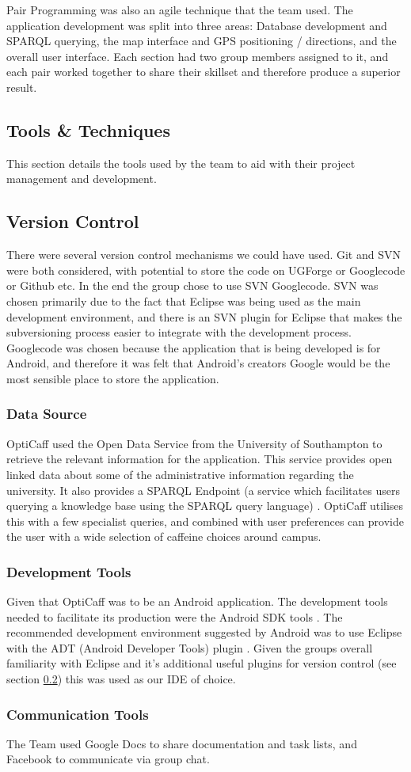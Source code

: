 Pair Programming was also an agile technique that the team used. The application development was split into three areas: Database development and SPARQL querying, the map interface and GPS positioning / directions, and the overall user interface. Each section had two group members assigned to it, and each pair worked together to share their skillset and therefore produce a superior result. 

\subsection{Tools \& Techniques}
This section details the tools used by the team to aid with their project management and development.

\subsection{Version Control}
\label{sec:VersionControl}
There were several version control mechanisms we could have used. Git and SVN were both considered, with potential to store the code on UGForge or Googlecode or Github etc. In the end the group chose to use SVN Googlecode. SVN was chosen primarily due to the fact that Eclipse was being used as the main development environment, and there is an SVN plugin for Eclipse that makes the subversioning process easier to integrate with the development process. Googlecode was chosen because the application that is being developed is for Android, and therefore it was felt that Android’s creators Google would be the most sensible place to store the application. 

\subsubsection{Data Source}
OptiCaff used the Open Data Service from the University of Southampton \cite{DataSouthampton} to retrieve the relevant information for the application. This service provides open linked data about some of the administrative information regarding the university. It also provides a SPARQL Endpoint \cite{SotonSparql} (a service which facilitates users querying a knowledge base using the SPARQL query language) \cite{SparqlEndpoint}. OptiCaff utilises this with a few specialist queries, and combined with user preferences can provide the user with a wide selection of caffeine choices around campus. 

\subsubsection{Development Tools}
Given that OptiCaff was to be an Android application. The development tools needed to facilitate its production were the Android SDK tools \cite{AndroidSDK}. The recommended development environment suggested by Android was to use Eclipse \cite{Eclipse} with the ADT (Android Developer Tools) plugin \cite{SDKAllOS}. Given the groups overall familiarity with Eclipse and it’s additional useful plugins for version control (see section \ref{sec:VersionControl}) this was used as our IDE of choice.

\subsubsection{Communication Tools}
The Team used Google Docs to share documentation and task lists, and Facebook to communicate via group chat. 
